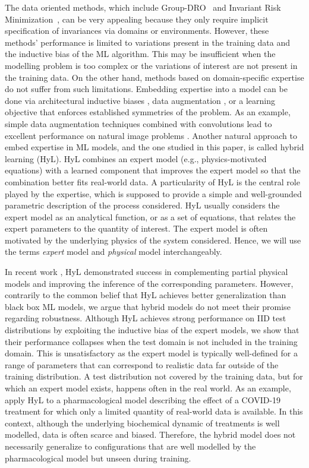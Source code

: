 \documentclass{article}
\begin{document}
The data oriented methods, which include Group-DRO~\citep{groupDRO_ICLR} and Invariant Risk Minimization~\citep[][IRM]{IRM}, can be very appealing because they only require implicit specification of invariances via domains or environments. However, these methods' performance is limited to variations present in the training data and the inductive bias of the ML algorithm. This may be insufficient when the modelling problem is too complex or the variations of interest are not present in the training data. On the other hand, methods based on domain-specific expertise do not suffer from such limitations. Embedding expertise into a model can be done via architectural inductive biases \citep{lecun_cnn, gnn}, data augmentation \citep{cubuk2019autoaugment}, or a learning objective \citep{lagrangian_nn} that enforces established symmetries of the problem. As an example, simple data augmentation techniques combined with convolutions lead to excellent performance on natural image problems \citep{cubuk2019autoaugment}. Another natural approach to embed expertise in ML models, and the one studied in this paper, is called hybrid learning (HyL). HyL combines an expert model (e.g., physics-motivated equations) with a learned component that improves the expert model so that the combination better fits real-world data. A particularity of HyL is the central role played by the expertise, which is supposed to provide a simple and well-grounded parametric description of the process considered. HyL usually considers the expert model as an analytical function, or as a set of equations, that relates the expert parameters to the quantity of interest. The expert model is often motivated by the underlying physics of the system considered. Hence, we will use the terms \textit{expert} model and \textit{physical} model interchangeably.

In recent work \citep{APHYNITY, HVAE, latent_ode_pharma, hl_1, hl_2, hl_3}, HyL demonstrated success in complementing partial physical models and improving the inference of the corresponding parameters. However, contrarily to the common belief that HyL achieves better generalization than black box ML models, we argue that hybrid models do not meet their promise regarding robustness. Although HyL achieves strong performance on IID test distributions by exploiting the inductive bias of the expert models, we show that their performance collapses when the test domain is not included in the training domain. This is unsatisfactory as the expert model is typically well-defined for a range of parameters that can correspond to realistic data far outside of the training distribution. A test distribution not covered by the training data, but for which an expert model exists, happens often in the real world. As an example, \citet{latent_ode_pharma} apply HyL to a pharmacological model describing the effect of a COVID-19 treatment for which only a limited quantity of real-world data is available. In this context, although the underlying biochemical dynamic of treatments is well modelled, data is often scarce and biased. Therefore, the hybrid model does not necessarily generalize to configurations that are well modelled by the pharmacological model but unseen during training.
\end{document}
